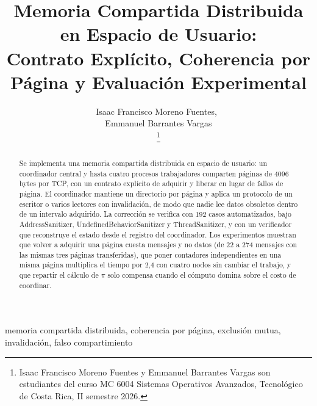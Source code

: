\documentclass[journal]{IEEEtran}
\title{\LARGE Memoria Compartida Distribuida en Espacio de Usuario:\\
Contrato Expl\'icito, Coherencia por P\'agina y Evaluaci\'on Experimental}
\author{
    Isaac Francisco Moreno Fuentes,~\\
    Emmanuel Barrantes Vargas\\
    \thanks{Isaac Francisco Moreno Fuentes y Emmanuel Barrantes Vargas son estudiantes del curso MC 6004 Sistemas Operativos Avanzados, Tecnológico de Costa Rica, II semestre 2026.}
}
\begin{document}
\maketitle

\begin{abstract}
Se implementa una memoria compartida distribuida en espacio de usuario: un
coordinador central y hasta cuatro procesos trabajadores comparten páginas de
4096 bytes por TCP, con un contrato explícito de adquirir y liberar en lugar de
fallos de página. El coordinador mantiene un directorio por página y aplica un
protocolo de un escritor o varios lectores con invalidación, de modo que nadie
lee datos obsoletos dentro de un intervalo adquirido. La corrección se
verifica con 192 casos automatizados, bajo AddressSanitizer,
UndefinedBehaviorSanitizer y ThreadSanitizer, y con un verificador que
reconstruye el estado desde el registro del coordinador. Los experimentos
muestran que volver a adquirir una página cuesta mensajes y no datos (de 22 a
274 mensajes con las mismas tres páginas transferidas), que poner contadores
independientes en una misma página multiplica el tiempo por 2,4 con cuatro
nodos sin cambiar el trabajo, y que repartir el cálculo de $\pi$ solo
compensa cuando el cómputo domina sobre el costo de coordinar.
\end{abstract}

\begin{IEEEkeywords}
memoria compartida distribuida, coherencia por página, exclusión mutua,
invalidación, falso compartimiento
\end{IEEEkeywords}
















\end{document}
